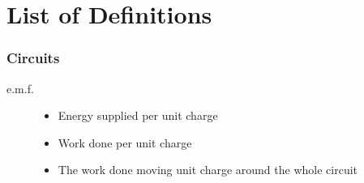 \chapter{List of Definitions}

\subsection{Circuits}

\begin{description}
  \item[e.m.f.] \hfill
    \begin{itemize}
      \item Energy supplied per unit charge
      \item Work done per unit charge
      \item The work done moving unit charge around the whole circuit
    \end{itemize}
\end{description}
